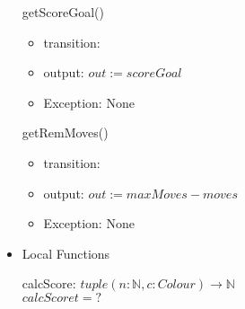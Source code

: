 \documentclass[11pt]{article}
\begin{document}
\begin{itemize}
getScoreGoal()
\begin{itemize}
\item transition:
\item output: \(out := scoreGoal\)
\item Exception: None
\end{itemize}

getRemMoves()
\begin{itemize}
\item transition:
\item output: \(out := maxMoves - moves\)
\item Exception: None
\end{itemize}

\item Local Functions
\label{sec:orga96178d}

calcScore: \(tuple(n: \mathbb{N}, c: Colour) \rightarrow \mathbb{N}\) \\
\(calcScore t = ?\)
\end{itemize}
\end{document}
